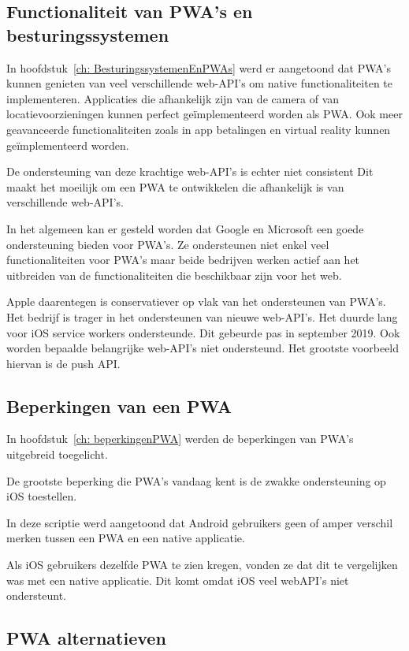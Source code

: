 	\subsection{Functionaliteit van PWA's en besturingssystemen}
	
		In hoofdstuk~\ref{ch: BesturingssystemenEnPWAs} werd er aangetoond dat PWA's kunnen genieten van veel verschillende web-API's om native functionaliteiten te implementeren. Applicaties die afhankelijk zijn van de camera of van locatievoorzieningen kunnen perfect geïmplementeerd worden als PWA. Ook meer geavanceerde functionaliteiten zoals in app betalingen en virtual reality kunnen geïmplementeerd worden.
		
		De ondersteuning van deze krachtige web-API's is echter niet consistent Dit maakt het moeilijk om een PWA te ontwikkelen die afhankelijk is van verschillende web-API's. 
		
		In het algemeen kan er gesteld worden dat Google en Microsoft een goede ondersteuning bieden voor PWA's. Ze ondersteunen niet enkel veel functionaliteiten voor PWA's maar beide bedrijven werken actief aan het uitbreiden van de functionaliteiten die beschikbaar zijn voor het web. 
		
		Apple daarentegen is conservatiever op vlak van het ondersteunen van PWA's. Het bedrijf is trager in het ondersteunen van nieuwe web-API's. 
		Het duurde lang voor iOS service workers ondersteunde. Dit gebeurde pas in september 2019. Ook worden bepaalde belangrijke web-API's niet ondersteund. Het grootste voorbeeld hiervan is de push API.
					
	\subsection{Beperkingen van een PWA}
		In hoofdstuk~\ref{ch: beperkingenPWA} werden de beperkingen van PWA's uitgebreid toegelicht. 
	
		De grootste beperking die PWA's vandaag kent is de zwakke ondersteuning op iOS toestellen.
		
		In deze scriptie werd aangetoond dat Android gebruikers geen of amper verschil merken tussen een PWA en een native applicatie.  
		
		Als iOS gebruikers dezelfde PWA te zien kregen, vonden ze dat dit te vergelijken was met een native applicatie. Dit komt omdat iOS veel webAPI's niet ondersteunt.
		
	 
	
	\subsection{PWA alternatieven}
		
